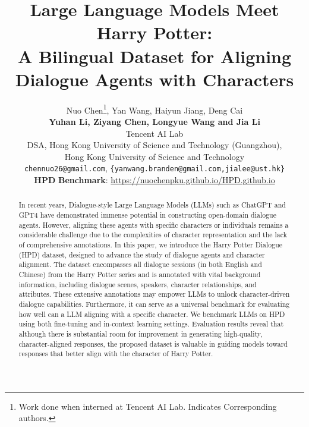 \documentclass[11pt]{article}
\title{Large Language Models Meet Harry Potter: \\A Bilingual Dataset for Aligning Dialogue Agents with Characters}
\author{Nuo Chen\thanks{\; Work done when interned at Tencent AI Lab.  Indicates Corresponding authors.}, Yan Wang, Haiyun Jiang, Deng Cai\\ 
\textbf{Yuhan Li, Ziyang Chen, Longyue Wang and Jia Li}
\\
Tencent AI Lab \\
DSA, Hong Kong University of Science and Technology (Guangzhou),\\ Hong Kong University of Science and Technology \\
\texttt{chennuo26@gmail.com},  \texttt{\{yanwang.branden@gmail.com,jialee@ust.hk\}}
 \\
\textbf{HPD} \textbf{Benchmark}: \url{https://nuochenpku.github.io/HPD.github.io}}
\begin{document}
\maketitle
\begin{abstract}








In recent years, Dialogue-style Large Language Models (LLMs) such as ChatGPT and GPT4 have demonstrated immense potential in constructing open-domain dialogue agents. However, aligning these agents with specific characters or individuals remains a considerable challenge due to the complexities of character representation and the lack of comprehensive annotations. In this paper, we introduce the Harry Potter Dialogue (HPD) dataset, designed to advance the study of dialogue agents and character alignment. The dataset encompasses all dialogue sessions (in both English and Chinese) from the Harry Potter series and is annotated with vital background information, including dialogue scenes, speakers, character relationships, and attributes. These extensive annotations may empower LLMs to unlock character-driven dialogue capabilities. Furthermore, it can serve as a universal benchmark for evaluating how well can a LLM aligning with a specific character. We benchmark LLMs on HPD using both fine-tuning and in-context learning settings. Evaluation results reveal that although there is substantial room for improvement in generating high-quality, character-aligned responses, the proposed dataset is valuable in guiding models toward responses that better align with the character of Harry Potter.























\end{abstract}
\end{document}
